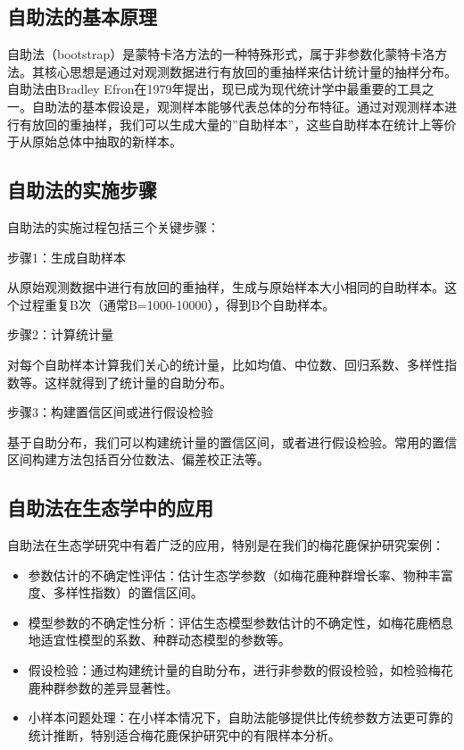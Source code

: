 \documentclass[
  twoside,12pt,fontset=none]{ctexbook}
\providecommand{\tightlist}{%
  \setlength{\itemsep}{0pt}\setlength{\parskip}{0pt}}
\begin{document}
\hypertarget{ux81eaux52a9ux6cd5ux7684ux57faux672cux539fux7406}{%
\subsection{自助法的基本原理}\label{ux81eaux52a9ux6cd5ux7684ux57faux672cux539fux7406}}

自助法（bootstrap）是蒙特卡洛方法的一种特殊形式，属于非参数化蒙特卡洛方法。其核心思想是通过对观测数据进行有放回的重抽样来估计统计量的抽样分布。自助法由Bradley Efron在1979年提出，现已成为现代统计学中最重要的工具之一。自助法的基本假设是，观测样本能够代表总体的分布特征。通过对观测样本进行有放回的重抽样，我们可以生成大量的''自助样本''，这些自助样本在统计上等价于从原始总体中抽取的新样本。

\hypertarget{ux81eaux52a9ux6cd5ux7684ux5b9eux65bdux6b65ux9aa4}{%
\subsection{自助法的实施步骤}\label{ux81eaux52a9ux6cd5ux7684ux5b9eux65bdux6b65ux9aa4}}

自助法的实施过程包括三个关键步骤：

步骤1：生成自助样本

从原始观测数据中进行有放回的重抽样，生成与原始样本大小相同的自助样本。这个过程重复B次（通常B=1000-10000），得到B个自助样本。

步骤2：计算统计量

对每个自助样本计算我们关心的统计量，比如均值、中位数、回归系数、多样性指数等。这样就得到了统计量的自助分布。

步骤3：构建置信区间或进行假设检验

基于自助分布，我们可以构建统计量的置信区间，或者进行假设检验。常用的置信区间构建方法包括百分位数法、偏差校正法等。

\hypertarget{ux81eaux52a9ux6cd5ux5728ux751fux6001ux5b66ux4e2dux7684ux5e94ux7528}{%
\subsection{自助法在生态学中的应用}\label{ux81eaux52a9ux6cd5ux5728ux751fux6001ux5b66ux4e2dux7684ux5e94ux7528}}

自助法在生态学研究中有着广泛的应用，特别是在我们的梅花鹿保护研究案例：

\begin{itemize}
\tightlist
\item
  参数估计的不确定性评估：估计生态学参数（如梅花鹿种群增长率、物种丰富度、多样性指数）的置信区间。
\item
  模型参数的不确定性分析：评估生态模型参数估计的不确定性，如梅花鹿栖息地适宜性模型的系数、种群动态模型的参数等。
\item
  假设检验：通过构建统计量的自助分布，进行非参数的假设检验，如检验梅花鹿种群参数的差异显著性。
\item
  小样本问题处理：在小样本情况下，自助法能够提供比传统参数方法更可靠的统计推断，特别适合梅花鹿保护研究中的有限样本分析。
\end{itemize}
\end{document}
